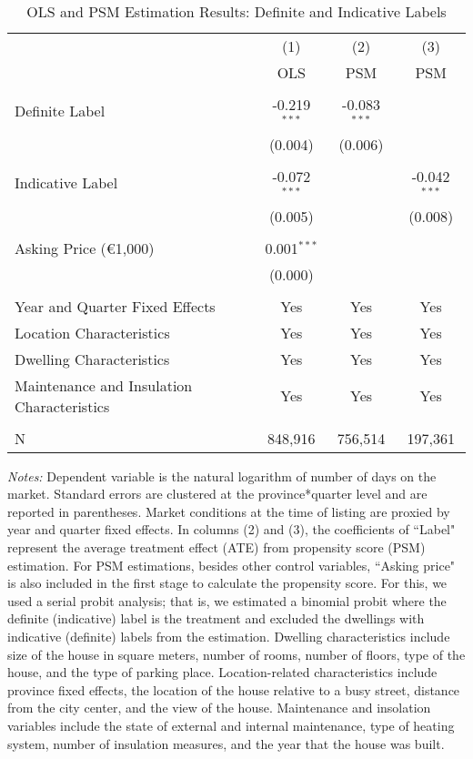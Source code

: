\documentclass[12pt]{article}
\begin{document}
\clearpage
\newpage
\begin{table}[H]
\footnotesize
  \centering
  \caption{OLS and PSM Estimation Results: Definite and Indicative Labels }
      \begin{tabular}{lccc}
\hline
                &\multicolumn{1}{c}{(1)}&\multicolumn{1}{c}{(2)}&\multicolumn{1}{c}{(3)}\\
&	OLS &	PSM&	PSM \\
\hline
&&&\\
Definite Label &	-0.219$^{***}$ & 	-0.083$^{***}$ & \\
& (0.004) & (0.006) & \\
&&&\\
Indicative Label &	-0.072$^{***}$ & & -0.042$^{***}$ \\
 & (0.005) & & (0.008) \\
&&&\\
Asking Price (\euro 1,000) &	0.001$^{***}$ & & \\
& (0.000) & & \\	
&&&\\
Year and Quarter Fixed Effects	& Yes &	Yes & Yes\\
Location Characteristics	& Yes &	Yes & Yes  \\
Dwelling Characteristics	& Yes &	Yes & Yes  \\
Maintenance and Insulation Characteristics	& Yes &	Yes & Yes  \\
&&&\\
N & 	848,916	& 756,514 &	197,361 \\
\hline

    \end{tabular}%
\begin{tablenotes}
\scriptsize
\item \textit{Notes:} Dependent variable is the natural logarithm of number of days on the market. Standard errors are clustered at the province*quarter level and are reported in parentheses. Market conditions at the time of listing are proxied by year and quarter fixed effects. In columns (2) and (3), the coefficients of ``Label" represent the average treatment effect (ATE) from propensity score (PSM) estimation. For PSM estimations, besides other control variables, ``Asking price" is also included in the first stage to calculate the propensity score. For this, we used a serial probit analysis; that is, we estimated a binomial probit where the definite (indicative) label is the treatment and excluded the dwellings with indicative (definite) labels from the estimation. Dwelling characteristics include size of the house in square meters, number of rooms, number of floors, type of the house, and the type of parking place. Location-related characteristics include province fixed effects, the location of the house relative to a busy street, distance from the city center, and the view of the house. Maintenance and insolation variables include the state of external and internal maintenance, type of heating system, number of insulation measures, and the year that the house was built. 
\end{tablenotes}

  \label{tab:addlabel}%
\end{table}%
\end{document}
